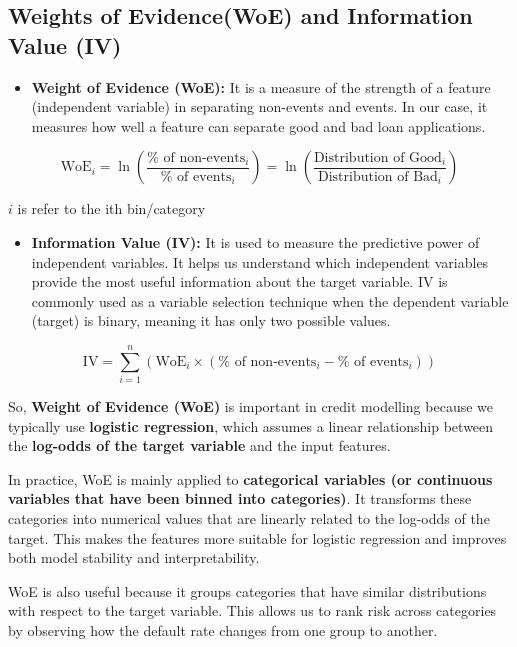 \documentclass[
  letterpaper,
  DIV=11,
  numbers=noendperiod]{scrartcl}
\providecommand{\tightlist}{%
  \setlength{\itemsep}{0pt}\setlength{\parskip}{0pt}}
\begin{document}
\subsection{Weights of Evidence(WoE) and Information Value (IV)}

\begin{itemize}
\tightlist
\item
  \textbf{Weight of Evidence (WoE):} It is a measure of the strength of
  a feature (independent variable) in separating non-events and events.
  In our case, it measures how well a feature can separate good and bad
  loan applications.
\end{itemize}

\[\text{WoE}_i = \ln\left(\frac{\% \text{ of non-events}_i}{\% \text{ of events}_i}\right)
= \ln\left(\frac{\text{Distribution of Good}_i}{\text{Distribution of Bad}_i}\right)\]

\(i\) is refer to the ith bin/category

\begin{itemize}
\tightlist
\item
  \textbf{Information Value (IV):} It is used to measure the predictive
  power of independent variables. It helps us understand which
  independent variables provide the most useful information about the
  target variable. IV is commonly used as a variable selection technique
  when the dependent variable (target) is binary, meaning it has only
  two possible values.
\end{itemize}

\[
\text{IV} = \sum_{i=1}^{n} \left( \text{WoE}_i \times \left( \% \text{ of non-events}_i - \% \text{ of events}_i \right) \right)\]

So, \textbf{Weight of Evidence (WoE)} is important in credit modelling
because we typically use \textbf{logistic regression}, which assumes a
linear relationship between the \textbf{log-odds of the target variable}
and the input features.

In practice, WoE is mainly applied to \textbf{categorical variables (or
continuous variables that have been binned into categories)}. It
transforms these categories into numerical values that are linearly
related to the log-odds of the target. This makes the features more
suitable for logistic regression and improves both model stability and
interpretability.

WoE is also useful because it groups categories that have similar
distributions with respect to the target variable. This allows us to
rank risk across categories by observing how the default rate changes
from one group to another.
\end{document}
